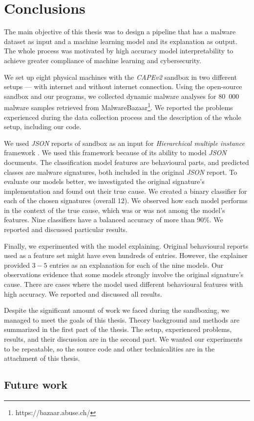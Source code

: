 \chapter{Conclusions} \label{chap:concl}
The main objective of this thesis was to design a pipeline that has a malware dataset as input and a machine learning model and its explanation as output. The whole process was motivated by high accuracy model interpretability to achieve greater compliance of machine learning and cybersecurity.

We set up eight physical machines with the \emph{CAPEv2} sandbox in two different setups --- with internet and without internet connection. Using the open-source sandbox and our programs, we collected dynamic malware analyses for 80~000 malware samples retrieved from MalwareBazaar\footnote{https://bazaar.abuse.ch/}. We reported the problems experienced during the data collection process and the description of the whole setup, including our code.

We used \emph{JSON} reports of sandbox as an input for \emph{Hierarchical multiple instance} framework \cite{Mandlik2020}. We used this framework because of its ability to model \emph{JSON} documents. The classification model features are behavioural parts, and predicted classes are malware signatures, both included in the original \emph{JSON} report. 
To evaluate our models better, we investigated the original signature's implementation and found out their true cause. We created a binary classifier for each of the chosen signatures (overall 12). We observed how each model performs in the context of the true cause, which was or was not among the model's features. Nine classifiers have a balanced accuracy of more than 90\%. We reported and discussed particular results.

Finally, we experimented with the model explaining. Original behavioural reports used as a feature set might have even hundreds of entries. However, the explainer provided $3-5$ entries as an explanation for each of the nine models. Our observations evidence that some models strongly involve the original signature's cause. There are cases where the model used different behavioural features with high accuracy. We reported and discussed all results.

Despite the significant amount of work we faced during the sandboxing, we managed to meet the goals of this thesis. Theory background and methods are summarized in the first part of the thesis. The setup, experienced problems, results, and their discussion are in the second part. We wanted our experiments to be repeatable, so the source code and other technicalities are in the attachment of this thesis.

\section*{Future work}

